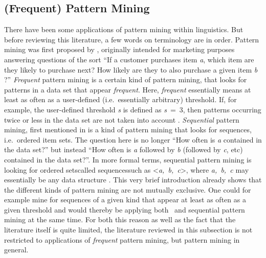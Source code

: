 \subsection{(Frequent) Pattern Mining}
\label{ssec:introresfpm}
There have been some applications of pattern mining within linguistics.
But before reviewing this literature, a few words on terminology are in order.
Pattern mining was first proposed by \citet{agrawal_mining_1993}, originally intended for marketing purposes answering questions of the sort
``If a customer purchases item \emph{a}, which item are they likely to purchase next?
How likely are they to also purchase a given item \emph{b} \citep[]{han_frequent_2007}?''
\emph{Frequent} pattern mining is a certain kind of pattern mining, that looks for patterns in a data set that appear \emph{frequent}.
Here, \emph{frequent} essentially means at least as often as a user-defined (i.e.~essentially arbitrary) threshold.
If, for example, the user-defined threshold \emph{s} is defined as \emph{s}~=~3, then patterns occurring twice or less in the data set are not taken into account \citep[]{han_data_2012}.
\emph{Sequential} pattern mining, first mentioned in \citet{agrawal_mining_1995} is a kind of pattern mining that looks for sequences, i.e.~ordered item sets.
The question here is no longer ``How often is \emph{a} contained in the data set?'' but instead ``How often is \emph{a} followed by \emph{b} (followed by \emph{c}, etc) contained in the data set?''.
In more formal terms, sequential pattern mining is looking for ordered sets\dash called sequences\dash such as <\emph{a,~b,~c}>, where \emph{a,~b,~c} may essentially be any data structure \citep[]{han_frequent_2007}.
This very brief introduction already shows that the different kinds of pattern mining are not mutually exclusive.
One could for example mine for sequences of a given kind that appear at least as often as a given threshold and would thereby be applying both \fpmlower\ and sequential pattern mining at the same time.
For both this reason as well as the fact that the literature itself is quite limited, the literature reviewed in this subsection is not restricted to applications of \emph{frequent} pattern mining, but pattern mining in general.

